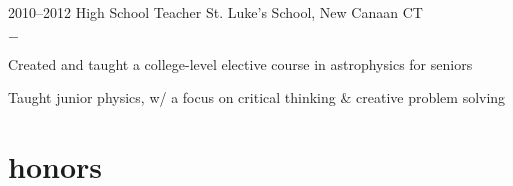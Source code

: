 \documentclass[]{luger-cv} %
\begin{document}
\begin{entrylist}

    \entry
    {2010--2012}
    {High School Teacher}
    {St. Luke's School, New Canaan CT}
    {%
        \vspace{-1em}
        \begin{list}{{\color{numcolor}$-$}}{\cvlist}
            \item Created and taught a college-level elective course in astrophysics for seniors
            \item Taught junior physics, w/ a focus on critical thinking \& creative problem solving
        \end{list}
    }


\end{entrylist}




\section{honors}
\end{document}
